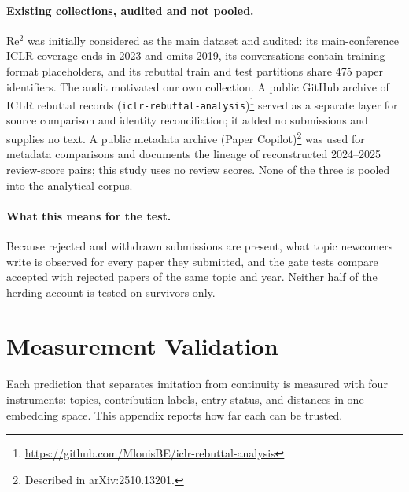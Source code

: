 \paragraph{Existing collections, audited and not pooled.} Re$^2$ \citep{zhang2025re2} was initially considered as the
main dataset and audited: its main-conference ICLR coverage ends in 2023 and omits 2019, its conversations contain
training-format placeholders, and its rebuttal train and test partitions share 475 paper identifiers. The audit
motivated our own collection. A public GitHub archive of ICLR rebuttal records (\texttt{iclr-rebuttal-analysis})\footnote{\url{https://github.com/MlouisBE/iclr-rebuttal-analysis}}
served as a separate layer for source comparison and identity reconciliation; it added no submissions and supplies no
text. A public metadata archive (Paper Copilot)\footnote{Described in arXiv:2510.13201.} was used for metadata comparisons and documents the lineage of reconstructed
2024--2025 review-score pairs; this study uses no review scores. None of the three is pooled into the analytical
corpus.

\paragraph{What this means for the test.} Because rejected and withdrawn submissions are present, what topic
newcomers write is observed for every paper they submitted, and the gate tests compare accepted with rejected papers
of the same topic and year. Neither half of the herding account is tested on survivors only.

\FloatBarrier
\section{Measurement Validation}\label{app:measure}

Each prediction that separates imitation from continuity is measured with four instruments: topics, contribution
labels, entry status, and distances in one embedding space. This appendix reports how far each can be trusted.

